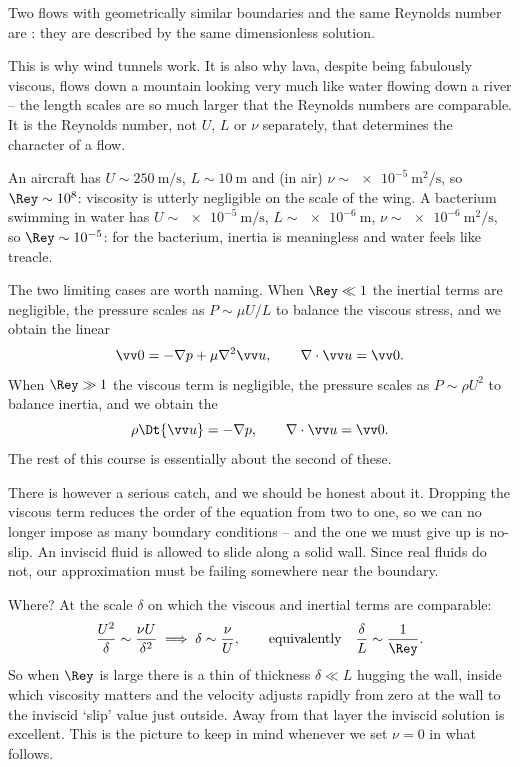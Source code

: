 \begin{definition}
	Two flows with geometrically similar boundaries and the same Reynolds number are : they are described by the same dimensionless solution.
\end{definition}

This is why wind tunnels work. It is also why lava, despite being fabulously viscous, flows down a mountain looking very much like water flowing down a river -- the length scales are so much larger that the Reynolds numbers are comparable. It is the Reynolds number, not $U$, $L$ or $\nu$ separately, that determines the character of a flow.

\begin{example}
	An aircraft has $U \sim \SI{250}{\meter\per\second}$, $L \sim \SI{10}{\meter}$ and (in air) $\nu \sim \SI{e-5}{\meter\squared\per\second}$, so $\Rey \sim 10^8$: viscosity is utterly negligible on the scale of the wing. A bacterium swimming in water has $U \sim \SI{e-5}{\meter\per\second}$, $L \sim \SI{e-6}{\meter}$, $\nu \sim \SI{e-6}{\meter\squared\per\second}$, so $\Rey \sim 10^{-5}$: for the bacterium, inertia is meaningless and water feels like treacle.
\end{example}

The two limiting cases are worth naming. When $\Rey \ll 1$ the inertial terms are negligible, the pressure scales as $P \sim \mu U/L$ to balance the viscous stress, and we obtain the linear 
$$
\vv 0 = -\nabla p + \mu \nabla^2 \vv u, \qquad \nabla \cdot \vv u = \vv 0.
$$
When $\Rey \gg 1$ the viscous term is negligible, the pressure scales as $P \sim \rho U^2$ to balance inertia, and we obtain the 
$$
\rho \Dt{\vv u} = -\nabla p, \qquad \nabla \cdot \vv u = \vv 0.
$$
The rest of this course is essentially about the second of these.

There is however a serious catch, and we should be honest about it. Dropping the viscous term reduces the order of the equation from two to one, so we can no longer impose as many boundary conditions -- and the one we must give up is no-slip. An inviscid fluid is allowed to slide along a solid wall. Since real fluids do not, our approximation must be failing somewhere near the boundary.

Where? At the scale $\delta$ on which the viscous and inertial terms are comparable:
$$
\frac{U^2}{\delta} \sim \frac{\nu U}{\delta^2} \implies \delta \sim \frac{\nu}{U}, \qquad \text{equivalently} \quad \frac{\delta}{L} \sim \frac{1}{\Rey}.
$$
So when $\Rey$ is large there is a thin  of thickness $\delta \ll L$ hugging the wall, inside which viscosity matters and the velocity adjusts rapidly from zero at the wall to the inviscid `slip' value just outside. Away from that layer the inviscid solution is excellent. This is the picture to keep in mind whenever we set $\nu = 0$ in what follows.

